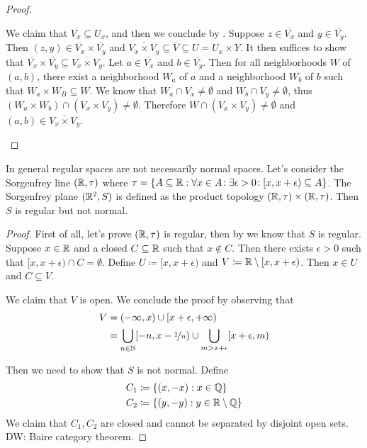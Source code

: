 \documentclass[screen]{techreport}
\numberwithin{equation}{section}
\newcommand{\diw}[1]{{\color{Red} DW: #1}}
\begin{document}
\begin{proof}
\begin{itemize}
		We claim that $\overline{V_x} \subseteq U_x$, and then we conclude by .
		Suppose $z \in \overline{V_x}$ and $y \in \overline{V_y}$.
		Then $(z,y) \in \overline{V_x} \times \overline{V_y}$ and $\overline{V_x \times V_y} \subseteq \overline{V} \subseteq U = U_x \times Y$.
		It then suffices to show that $\overline{V_x} \times \overline{V_y} \subseteq \overline{V_x \times V_y}$.
		Let $a \in \overline{V_x}$ and $b \in \overline{V_y}$.
		Then for all neighborhoods $W$ of $(a,b)$, there exist a neighborhood $W_a$ of $a$ and a neighborhood $W_b$ of $b$ such that $W_a \times W_B \subseteq W$.
		We know that $W_a \cap V_x \neq \emptyset$ and $W_b \cap V_y \neq \emptyset$,
		thus $(W_a \times W_b) \cap (V_x \times V_y) \neq \emptyset$.
		Therefore $W \cap (V_x \times V_y) \neq \emptyset$ and $(a,b) \in \overline{V_x\times V_y}$.
	\end{itemize}
\end{proof}

\begin{example}\label{Exa:RegularNotImplyNormal}
	In general regular spaces are not necessarily normal spaces.
	Let's consider the Sorgenfrey line $(\mathbb{R},\tau)$ where $\tau = \{ A \subseteq \mathbb{R} : \forall {x \in A}\!: \exists {\epsilon > 0}\!: [x,x+\epsilon) \subseteq A \}$.
	The Sorgenfrey plane $(\mathbb{R}^2,S)$ is defined as the product topology $(\mathbb{R},\tau) \times (\mathbb{R},\tau)$.
	Then $S$ is regular but not normal.
\end{example}
\begin{proof}
	First of all, let's prove $(\mathbb{R},\tau)$ is regular, then by  we know that $S$ is regular.
	Suppose $x \in \mathbb{R}$ and a closed $C \subseteq \mathbb{R}$ such that $x \not\in C$.
	Then there exists $\epsilon>0$ such that $[x,x+\epsilon) \cap C = \emptyset$.
	Define $U \coloneqq [x,x+\epsilon)$ and $V \coloneqq \mathbb{R} \setminus [x,x+\epsilon)$.
	Then $x \in U$ and $C \subseteq V$.
	
	We claim that $V$ is open. We conclude the proof by observing that
	\begin{align}
		V & = (-\infty,x) \cup [x+\epsilon,+\infty) \\
		& = \bigcup_{n \in \mathbb{N}} [-n, x-\nicefrac{1}{n}) \cup \bigcup_{m > x + \epsilon} [x+\epsilon,m)
	\end{align}
	
	Then we need to show that $S$ is not normal.
	Define
	\begin{align}
		C_1 & \coloneqq \{ (x,-x) : x \in \mathbb{Q} \} \\
		C_2 & \coloneqq \{ (y,-y) : y \in \mathbb{R} \setminus \mathbb{Q} \}
	\end{align}
	We claim that $C_1,C_2$ are closed and cannot be separated by disjoint open sets.
	\diw{Baire category theorem.}
\end{proof}
\end{document}
